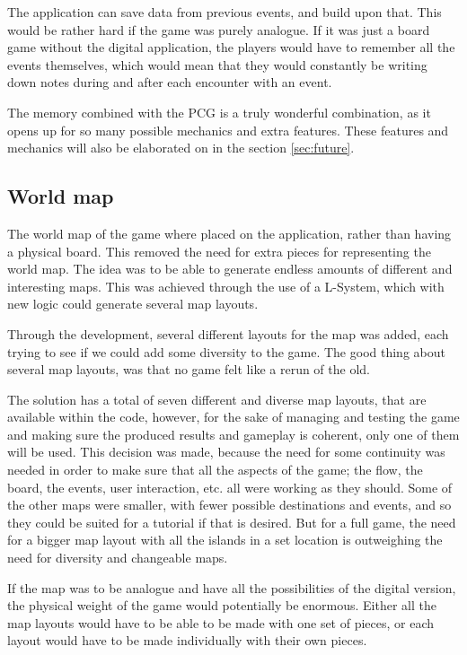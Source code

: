 The application can save data from previous events, and build upon that. This would be rather hard if the game was purely analogue. If it was just a board game without the digital application, the players would have to remember all the events themselves, which would mean that they would constantly be writing down notes during and after each encounter with an event.

The memory combined with the PCG is a truly wonderful combination, as it opens up for so many possible mechanics and extra features. These features and mechanics will also be elaborated on in the section \ref{sec:future}.

\subsection{World map}
The world map of the game where placed on the application, rather than having a physical board.
This removed the need for extra pieces for representing the world map. 
The idea was to be able to generate endless amounts of different and interesting maps. This was achieved through the use of a L-System, which with new logic could generate several map layouts.

Through the development, several different layouts for the map was added, each trying to see if we could add some diversity to the game.
The good thing about several map layouts, was that no game felt like a rerun of the old.

The solution has a total of seven different and diverse map layouts, that are available within the code, however, for the sake of managing and testing the game and making sure the produced results and gameplay is coherent, only one of them will be used. 
This decision was made, because the need for some continuity was needed in order to make sure that all the aspects of the game; the flow, the board, the events, user interaction, etc. all were working as they should. Some of the other maps were smaller, with fewer possible destinations and events, and so they could be suited for a tutorial if that is desired. But for a full game, the need for a bigger map layout with all the islands in a set location is outweighing the need for diversity and changeable maps.

If the map was to be analogue and have all the possibilities of the digital version, the physical weight of the game would potentially be enormous. 
Either all the map layouts would have to be able to be made with one set of pieces, or each layout would have to be made individually with their own pieces. 

